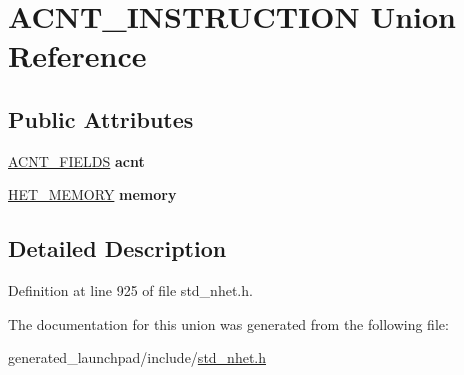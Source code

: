 \hypertarget{unionACNT__INSTRUCTION}{}\section{A\+C\+N\+T\+\_\+\+I\+N\+S\+T\+R\+U\+C\+T\+I\+ON Union Reference}
\label{unionACNT__INSTRUCTION}
\subsection*{Public Attributes}
\begin{DoxyCompactItemize}
\item 
\mbox{\label{unionACNT__INSTRUCTION_a805f24215d85dedc0891795ad1ea673e}} 
\mbox{\hyperlink{structacnt__format}{A\+C\+N\+T\+\_\+\+F\+I\+E\+L\+DS}} {\bfseries acnt}
\item 
\mbox{\label{unionACNT__INSTRUCTION_a780c3cd73ee50b1ec9669f22b939955a}} 
\mbox{\hyperlink{structmemory__format}{H\+E\+T\+\_\+\+M\+E\+M\+O\+RY}} {\bfseries memory}
\end{DoxyCompactItemize}


\subsection{Detailed Description}


Definition at line 925 of file std\+\_\+nhet.\+h.



The documentation for this union was generated from the following file\+:\begin{DoxyCompactItemize}
\item 
generated\+\_\+launchpad/include/\mbox{\hyperlink{std__nhet_8h}{std\+\_\+nhet.\+h}}\end{DoxyCompactItemize}
